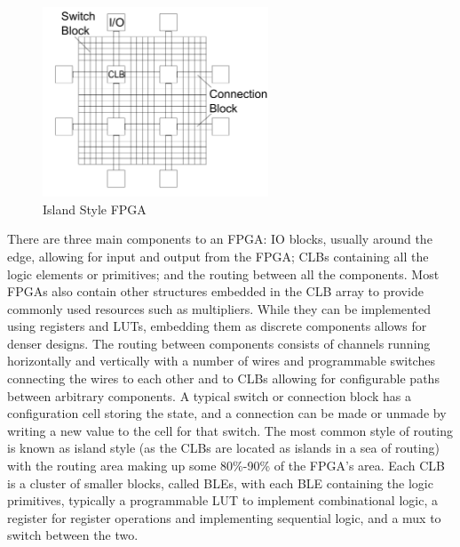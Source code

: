\documentclass[12pt,final,oneside]{dwThesis} %
\begin{document}
   \begin{figure}

      \begin{center}

         \includegraphics[width=0.6\textwidth]{images/ArchFull.pdf}
         \caption{Island Style FPGA} \label{FPGAArch} 
      \end{center}

   \end{figure}


   There are three main components to an \gls{FPGA}: \gls{IO} blocks, usually
   around the edge, allowing for input and output from the \gls{FPGA};
   \glspl{CLB} containing all the logic elements or \glspl{primitive}; and the
   routing between all the components.  Most \glspl{FPGA} also contain other
   structures embedded in the \gls{CLB} array to provide commonly used
   resources such as multipliers. While they can be implemented using registers
   and \glspl{LUT}, embedding them as discrete components allows for denser
   designs.  The routing between components consists of channels running
   horizontally and vertically with a number of wires and programmable switches
   connecting the wires to each other and to \glspl{CLB} allowing for
   configurable paths between arbitrary components. A typical switch or
   connection block has a configuration cell storing the state, and a
   connection can be made or unmade by writing a new value to the cell for that
   switch. The most common style of routing is known as island style (as the
   \glspl{CLB} are located as islands in a sea of routing) with the routing
   area making up some 80\%-90\% of the \gls{FPGA}'s area\cite{FPGAArch}.  Each
   \gls{CLB} is a cluster of smaller blocks, called \glspl{BLE}, with each
   \gls{BLE} containing the logic primitives, typically a programmable
   \gls{LUT} to implement combinational logic, a register for register operations
   and implementing sequential logic, and a \gls{mux} to switch between the
   two.
   
\end{document}
